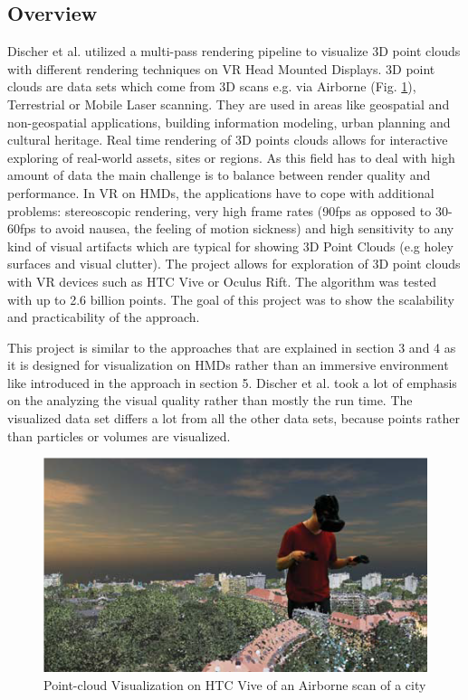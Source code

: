 \documentclass[10pt,twocolumn,letterpaper]{article}
\begin{document}
\subsection{Overview}
Discher et al. \cite{discher_point-based_2018} utilized a multi-pass rendering pipeline to visualize 3D point clouds with different rendering techniques on VR Head Mounted Displays. 3D point clouds are data sets which come from 3D scans e.g. via Airborne (Fig. \ref{fig:pointcloud_1}), Terrestrial or Mobile Laser scanning. They are used in areas like geospatial and non-geospatial applications, building information modeling, urban planning and cultural heritage. Real time rendering of 3D points clouds allows for interactive exploring of real-world assets, sites or regions. As this field has to deal with high amount of data the main challenge is to balance between render quality and performance. In VR on HMDs, the applications have to cope with additional problems: stereoscopic rendering, very high frame rates (90fps as opposed to 30-60fps to avoid nausea, the feeling of motion sickness) and high sensitivity to any kind of visual artifacts which are typical for showing 3D Point Clouds (e.g holey surfaces and visual clutter). The project allows for exploration of 3D point clouds with VR devices such as HTC Vive or Oculus Rift. The algorithm was tested with up to 2.6 billion points. The goal of this project was to show the scalability and practicability of the approach. 

This project is similar to the approaches that are explained in section 3 and 4 as it is designed for visualization on HMDs rather than an immersive environment like introduced in the approach in section 5. Discher et al. \cite{discher_point-based_2018} took a lot of emphasis on the analyzing the visual quality rather than mostly the run time. The visualized data set differs a lot from all the other data sets, because points rather than particles or volumes are visualized.
\begin{figure}
	\includegraphics{pointcloud_1.png}
	\caption{Point-cloud Visualization on HTC Vive of an Airborne scan of a city}
	\label{fig:pointcloud_1}
\end{figure}
\end{document}
